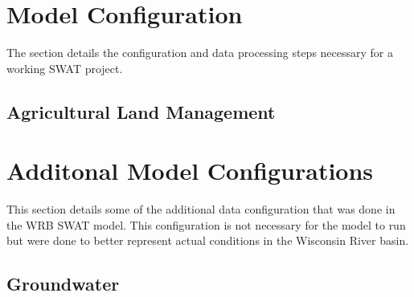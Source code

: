 	
\section{Model Configuration}
	The section details the configuration and data processing steps necessary for a working SWAT project.
	
	
	
	
	
	
	
\pagebreak
\subsection{Agricultural Land Management}\label{sec:ag_land_mgt}
	

%		
	
\pagebreak
\section{Additonal Model Configurations}
	This section details some of the additional data configuration that was done in the WRB SWAT model. This configuration is not necessary for the model to run but were done to better represent actual conditions in the Wisconsin River basin.
	
	
	
	
	
\subsection{Groundwater}
	
	
	
	
\pagebreak